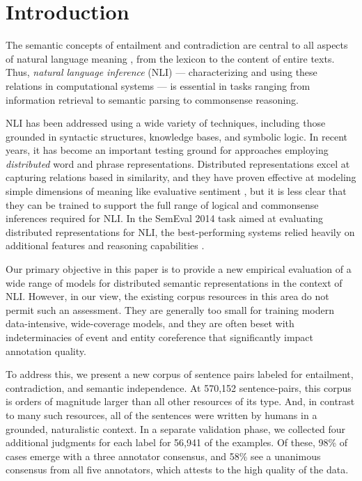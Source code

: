 \section{Introduction}\label{sec:introduction}

The semantic concepts of entailment and contradiction are central to
all aspects of natural language meaning
\cite{Katz72,vanBenthem08NATLOG}, from the lexicon to the content of
entire texts. Thus, \emph{natural language
  inference} (NLI) --- characterizing and using these relations in
computational systems
\cite{dagan2006pascal,MacCartney09,maccartney2009extended} --- is
essential in tasks ranging from information retrieval to semantic
parsing to commonsense reasoning.

NLI has been addressed using a wide variety of techniques, including
those grounded in syntactic structures, knowledge bases, and symbolic
logic. In recent years, it has become an important testing ground for
approaches employing \emph{distributed} word and phrase
representations. Distributed representations excel at capturing
relations based in similarity, and they have proven effective at
modeling simple dimensions of meaning like evaluative sentiment
\cite{socher2013acl1}, but it is less clear that they can be
trained to support the full range of logical and commonsense
 inferences required for NLI. In the SemEval 2014 task aimed at evaluating distributed
representations for NLI, the best-performing systems relied heavily on
additional features and reasoning capabilities
\cite{marelli2014semeval}. 

Our primary objective in this paper is to provide a new empirical
evaluation of a wide range of models for distributed semantic
representations in the context of NLI. However, in our view, the
existing corpus resources in this area do not permit such an
assessment. They are generally too small for training modern
data-intensive, wide-coverage models, and they are often beset with
indeterminacies of event and entity coreference that significantly
impact annotation quality.

To address this, we present a new corpus of sentence pairs labeled for
entailment, contradiction, and semantic independence. At 570,152
sentence-pairs, this corpus is orders of magnitude larger than all
other resources of its type. And, in contrast to many such resources,
all of the sentences were written by humans in a grounded,
naturalistic context. In a separate validation phase, we collected
four additional judgments for each label for 56,941 of the examples.
Of these, 98\% of cases emerge with a three annotator consensus, 
and 58\% see a unanimous consensus from all five annotators, 
which attests to the high quality of the data.

